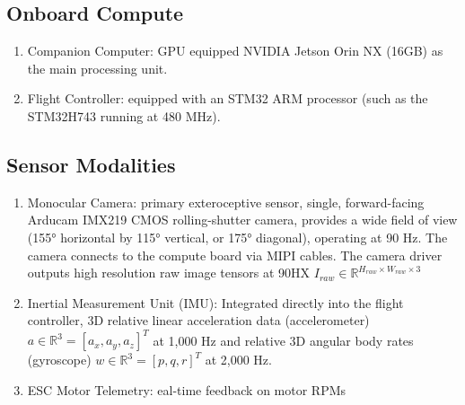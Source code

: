 \documentclass{article}
\begin{document}
\subsection{Onboard Compute}
\begin{enumerate}
    \item Companion Computer: GPU equipped NVIDIA Jetson Orin NX (16GB) as the main processing unit.
    \item Flight Controller: equipped with an STM32 ARM processor (such as the STM32H743 running at 480 MHz). 
\end{enumerate}

\subsection{Sensor Modalities}
\begin{enumerate}
    \item Monocular Camera: primary exteroceptive sensor, single, forward-facing Arducam IMX219 CMOS rolling-shutter camera, provides a wide field of view (155° horizontal by 115° vertical, or 175° diagonal), operating at 90 Hz. The camera connects to the compute board via MIPI cables. The camera driver outputs high resolution raw image tensors at 90HX $I_{raw}\in\mathbb{R}^{H_{raw}×W_{raw}×3}$
    \item Inertial Measurement Unit (IMU):  Integrated directly into the flight controller, 3D relative linear acceleration data (accelerometer) $a\in\mathbb{R}^3=[a_x, a_y, a_z]^T$ at 1,000 Hz and relative 3D angular body rates (gyroscope) $w\in\mathbb{R}^3=[p,q,r]^T$ at 2,000 Hz.
    \item ESC Motor Telemetry: eal-time feedback on motor RPMs
\end{enumerate}
\end{document}
